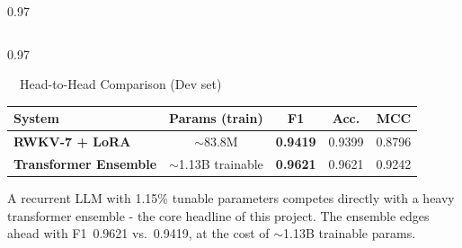 \documentclass[final,t]{beamer}
\begin{document}
\begin{frame}[t]
\begin{columns}[t,totalwidth=\paperwidth]
\begin{column}{0.97\paperwidth}
\begin{minipage}[t][\solncolheight][t]{\solncolwidth}
\vfill
\end{minipage}%
\end{column}
\end{columns}

\vspace{0.1cm}

\newlength{\bottomrowheight}
\setlength{\bottomrowheight}{7cm}

\begin{columns}[t,totalwidth=\paperwidth]
\begin{column}{0.97\paperwidth}
\noindent
\begin{minipage}[t][\bottomrowheight][t]{\solncolwidth}

\begin{block}{\faBalanceScaleLeft\ \ Head-to-Head Comparison (Dev set)}
\centering
\renewcommand{\arraystretch}{1.25}
\vspace{0.15cm}
\begin{tabular}{lcccc}
\toprule
\textbf{System} & \textbf{Params (train)} & \textbf{F1}
                & \textbf{Acc.} & \textbf{MCC} \\
\midrule
\textcolor{rwkvBlue}{\textbf{RWKV-7 + LoRA}} &
$\sim$83.8M & \textbf{0.9419} & 0.9399 & 0.8796 \\
\textcolor{ensembleOrange}{\textbf{Transformer Ensemble}} &
$\sim$1.13B trainable & \textcolor{accentGreen}{\textbf{0.9621}} & 0.9621 & 0.9242 \\
\bottomrule
\end{tabular}

\vspace{0.3em}
\small A recurrent LLM with 1.15\% tunable parameters competes
directly with a heavy transformer ensemble - the core
headline of this project. The ensemble edges ahead with
F1~0.9621 vs.\ 0.9419, at the cost of $\sim$1.13B trainable params.
\end{block}

\vfill
\end{minipage}%
\hfill
\begin{minipage}[t][\bottomrowheight][t]{\solncolwidth}


\end{minipage}
\end{column}
\end{columns}
\end{frame}
\end{document}

